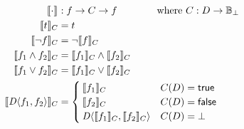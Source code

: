 \begin{align*}
  \sem[]{\cdot} &: f\rightarrow C \rightarrow f
    \qquad\qquad \text{where } C : D\rightarrow\mathbb{B}_\bot \\
  \sem[C]{t}             &= t \\
  \sem[C]{\neg f}        &= \neg \sem[C]{f} \\
  \sem[C]{f_1\wedge f_2} &= \sem[C]{f_1}\wedge\sem[C]{f_2}\\
  \sem[C]{f_1\vee f_2}   &= \sem[C]{f_1}\vee\sem[C]{f_2}\\
  \sem[C]{\chc[D]{f_1,f_2}} &=
    \begin{cases}
      \sem[C]{f_1}                       & C(D) = \true \\
      \sem[C]{f_2}                       & C(D) = \false \\
      \chc[D]{\sem[C]{f_1},\sem[C]{f_2}} & C(D) = \bot \\
    \end{cases}
\end{align*}
